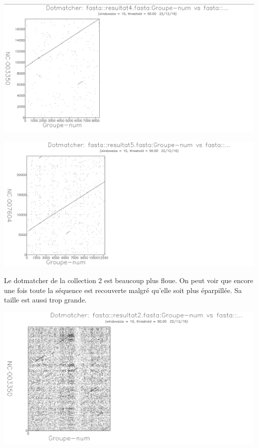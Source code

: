 \documentclass{article}
\begin{document}
\begin{center}
\includegraphics[scale=0.5]{dotmatcher4.png}
\end{center}

\begin{center}
\includegraphics[scale=0.5]{dotmatcher5.png}
\end{center}

Le dotmatcher de la collection 2 est beaucoup plus floue. On peut voir que encore une fois toute la séquence est recouverte malgré qu'elle soit plus éparpillée. Sa taille est aussi trop grande.
\begin{center}
\includegraphics[scale=0.5]{dotmatcher2.png}
\end{center}
\end{document}

